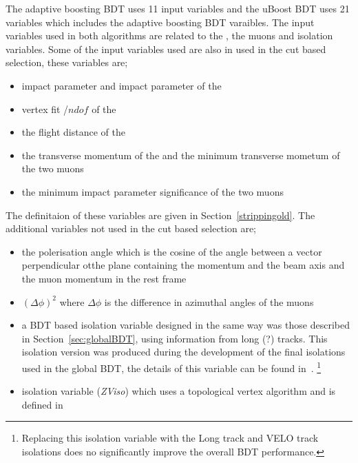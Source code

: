 The adaptive boosting BDT uses 11 input variables and the uBoost BDT uses 21 variables which includes the adaptive boosting BDT varaibles.
The input variables used in both algorithms are related to the \bs, the muons and isolation variables. Some of the input variables used are also in used in the cut based selection, these variables are; 
\begin{itemize}
\item impact parameter and impact parameter \chisqd of the \bs
\item vertex fit \chisqd/$ndof$ of the \bs 
\item the flight distance \chisqd of the \bs
\item the transverse momentum of the \bs and the minimum transverse mometum of the two muons
\item the minimum impact parameter significance of the two muons
\end{itemize}
The definitaion of these variables are given in Section~\ref{strippingold}. The additional variables not used in the cut based selection are;
\begin{itemize}
\item  the polerisation angle which is the cosine of the angle between a vector perpendicular otthe plane containing the \bs momentum and the beam axis and the muon momentum in the \bs rest frame 
\item $(\Delta \phi)^{2}$ where $\Delta \phi$ is the difference in azimuthal angles of the muons\item a BDT based isolation variable designed in the same way was those described in Section~\ref{sec:globalBDT}, using information from long (?) tracks. This isolation version was produced during the development of the final isolations used in the global BDT, the details of this variable can be found in~\cite{Archilli:1970886}. \footnote{Replacing this isolation variable with the Long track and VELO track isolations does no significantly improve the overall BDT performance.}
\item isolation variable ({\it ZViso}) which uses a topological vertex algorithm and is defined in~\cite{Morda:2120795}
\end{itemize}

